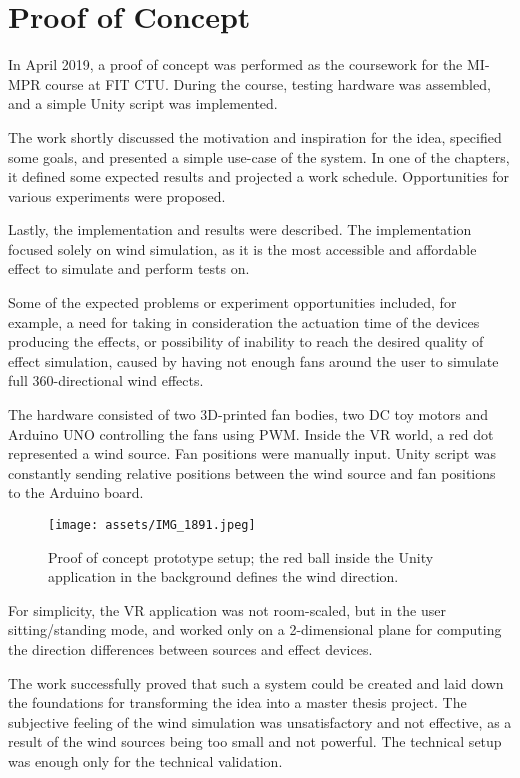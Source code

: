 \chapter{Proof of Concept}

In April 2019, a proof of concept was performed as the coursework for the MI-MPR
course at FIT CTU. During the course, testing hardware was assembled,
and a simple Unity script was implemented.


The work shortly discussed the motivation and inspiration for the idea,
specified some goals, and presented a simple use-case of the system. In one of the
chapters, it defined some expected results and projected a work schedule.
Opportunities for various experiments were proposed.


Lastly, the implementation and results were described. The implementation
focused solely on wind simulation, as it is the most accessible and affordable
effect to simulate and perform tests on.


Some of the expected problems or experiment opportunities included, for example,
a need for taking in consideration the actuation time of the devices producing
the effects, or possibility of inability to reach the desired quality of effect
simulation, caused by having not enough fans around the user to simulate
full 360-directional wind effects.


The hardware consisted of two 3D-printed fan bodies, two DC toy motors and Arduino
UNO controlling the fans using PWM. Inside
the VR world, a red dot represented a wind source. Fan positions were manually
input. Unity script was constantly sending relative positions between the
wind source and fan positions to the Arduino board.


\begin{figure}[h]{}
\centering\texttt{[image: assets/IMG\_1891.jpeg]}
\caption{
    Proof of concept prototype setup; the red ball inside the Unity application in the background defines the wind direction.
}
\end{figure}

For simplicity, the VR application was not room-scaled, but in the
user sitting/standing mode, and worked only on a 2-dimensional plane for
computing the direction differences between sources and effect devices.


The work successfully proved that such a system could be created and laid down
the foundations for transforming the idea into a master thesis project. The subjective
feeling of the wind simulation was unsatisfactory and not effective, 
as a result of the wind sources being too small and not powerful. 
The technical setup was enough only for the technical validation.

